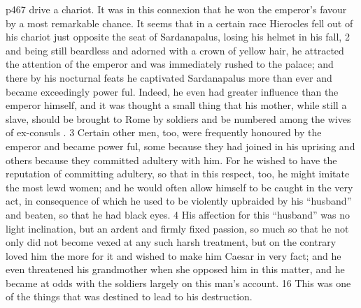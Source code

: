 p467 drive a chariot. It was in this connexion that he won the emperor's favour by a most remarkable chance. It seems that in a certain race Hierocles fell out of his chariot just opposite the seat of Sardanapalus, losing his helmet in his fall, 2 and being still beardless and adorned with a crown of yellow hair, he attracted the attention of the emperor and was immediately rushed to the palace; and there by his nocturnal feats he captivated Sardanapalus more than ever and became exceedingly power ­ful. Indeed, he even had greater influence than the emperor himself, and it was thought a small thing that his mother, while still a slave, should be brought to Rome by soldiers and be numbered among the wives of ex-consuls . 3 Certain other men, too, were frequently honoured by the emperor and became power ­ful, some because they had joined in his uprising and others because they committed adultery with him. For he wished to have the reputation of committing adultery, so that in this respect, too, he might imitate the most lewd women; and he would often allow himself to be caught in the very act, in consequence of which he used to be violently upbraided by his ``husband'' and beaten, so that he had black eyes. 4 His affection for this ``husband'' was no light inclination, but an ardent and firmly fixed passion, so much so that he not only did not become vexed at any such harsh treatment, but on the contrary loved him the more for it and wished to make him Caesar in very fact; and he even threatened his grandmother when she opposed him in this matter, and he became at odds with the soldiers largely on this man's account. 16 This was one of the things that was destined to lead to his destruction.

